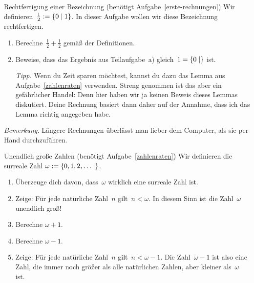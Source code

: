 \documentclass{zirkelblatt}
\begin{document}
\begin{aufgabe}{Rechtfertigung einer Bezeichnung (benötigt Aufgabe~\ref{erste-rechnungen})}
Wir definieren~$\tfrac{1}{2} := \{ 0 \mathrel{|} 1 \}$. In dieser Aufgabe wollen wir diese
Bezeichnung rechtfertigen.
\begin{enumerate}
\item Berechne~$\tfrac{1}{2} + \tfrac{1}{2}$ gemäß der Definitionen.
\item Beweise, dass das Ergebnis aus Teilaufgabe~a) gleich~$1 = \{ 0 \mathrel{|}  \}$ ist.

\emph{Tipp.} Wenn du Zeit sparen möchtest, kannst du dazu das Lemma aus
Aufgabe~\ref{zahlenraten} verwenden. Streng genommen ist das aber ein
gefährlicher Handel: Denn hier haben wir ja keinen Beweis dieses Lemmas
diskutiert. Deine Rechnung basiert dann daher auf der Annahme, dass ich das
Lemma richtig angegeben habe.
\end{enumerate}

\emph{Bemerkung.} Längere Rechnungen überlässt man lieber dem Computer, als sie
per Hand durchzuführen.
\end{aufgabe}

\begin{aufgabe}{Unendlich große Zahlen (benötigt Aufgabe~\ref{zahlenraten})}
\label{transfinit}
Wir definieren die surreale Zahl
$\omega := \{ 0, 1, 2, \ldots \mathrel{|}  \}$.
\begin{enumerate}
\item Überzeuge dich davon, dass~$\omega$ wirklich eine surreale Zahl ist.
\item Zeige: Für jede natürliche Zahl~$n$ gilt~$n < \omega$. In diesem Sinn ist
die Zahl~$\omega$ unendlich groß!
\item Berechne $\omega + 1$.
\item Berechne $\omega - 1$.
\item Zeige: Für jede natürliche Zahl~$n$ gilt~$n < \omega - 1$. Die
Zahl~$\omega - 1$ ist also eine Zahl, die immer noch größer als alle
natürlichen Zahlen, aber kleiner als~$\omega$ ist.
\end{enumerate}
\end{aufgabe}
\end{document}
